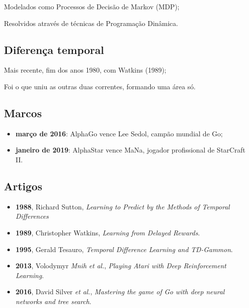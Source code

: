 \documentclass{article}
\begin{document}
            Modelados como Processos de Decisão de Markov (MDP);
            
            Resolvidos através de técnicas de Programação Dinâmica.
    
        
        \subsection{Diferença temporal}
            Mais recente, fim dos anos 1980, com Watkins     (1989);
            
            Foi o que uniu as outras duas correntes, formando uma área só.
            
        \subsection{Marcos}
        
            \begin{itemize}
                \item \textbf{março de 2016}: AlphaGo vence Lee Sedol, campão mundial de Go;
                \item \textbf{janeiro de 2019}: AlphaStar vence MaNa, jogador profissional de StarCraft II.
            \end{itemize}
        
        \subsection{Artigos}
        
            \begin{itemize}
                \item \textbf{1988}, Richard Sutton, \textit{Learning to Predict by the Methods of Temporal Differences}
                \item \textbf{1989}, Christopher Watkins, \textit{Learning from Delayed Rewards}.
                \item \textbf{1995}, Gerald Tesauro, \textit{Temporal Difference Learning and TD-Gammon}.
                \item \textbf{2013}, Volodymyr \textit{Mnih et al.}, \textit{Playing Atari with Deep Reinforcement Learning}.
                \item \textbf{2016}, David Silver \textit{et al.}, \textit{Mastering the game of Go with deep neural networks and tree search}.
            \end{itemize}

    
\end{document}
